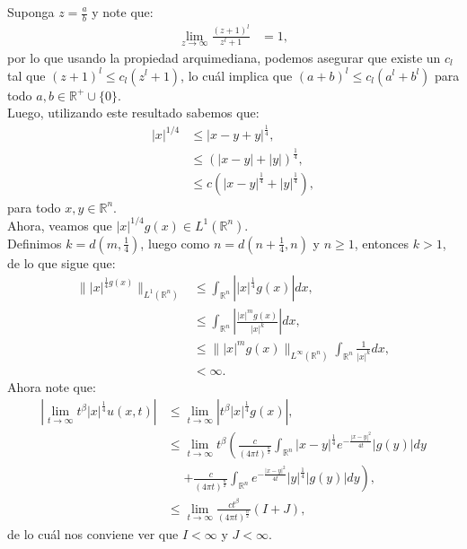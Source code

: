 \begin{homeworkProblem}
\begin{enumerate}
\begin{solucion}
      Suponga $z=\frac{a}{b}$ y note que:
      \begin{align*}
        \lim_{z \rightarrow \infty}\frac{(z+1)^l}{z^l+1}&=1,
      \end{align*}
      por lo que usando la propiedad arquimediana, podemos asegurar que existe un $c_l$ tal que $(z+1)^{l}\leq c_l(z^l+1)$, lo cuál implica que $(a+b)^{l}\leq c_l(a^l+b^l)$ para todo $a,b\in\mathbb{R}^{+}\cup\{0\}$.\\
      Luego, utilizando este resultado sabemos que:
      \begin{align*}
        |x|^{1/4}&\leq |x-y+y|^{\frac{1}{4}},\\
        &\leq (|x-y|+|y|)^{\frac{1}{4}},\\
        &\leq c(|x-y|^{\frac{1}{4}}+|y|^{\frac{1}{4}}),
      \end{align*}
      para todo $x,y\in\mathbb{R}^{n}$.\\
      Ahora, veamos que $|x|^{1/4}g(x)\in L^{1}(\mathbb{R}^{n})$.\\
      Definimos $k=d(m,\frac{1}{4})$, luego como $n=d(n+\frac{1}{4},n)$ y $n\geq 1$, entonces $k>1$, de lo que sigue que:
      \begin{align*}
        \||x|^{\frac{1}{4}g(x)}\|_{L^{1}(\mathbb{R}^{n})}&\leq \int_{\mathbb{R}^{n}}\left| |x|^{\frac{1}{4}}g(x) \right|dx,\\
        &\leq \int_{\mathbb{R}^{n}}\left| \frac{|x|^{m}g(x)}{|x|^{k}} \right|dx,\\
        &\leq \||x|^{m}g(x)\|_{L^{\infty}(\mathbb{R}^{n})}\int_{\mathbb{R}^{n}}\frac{1}{|x|^k}dx,\\
        &< \infty. 
      \end{align*}
      Ahora note que:
      \begin{align*}
        \left|\lim_{t \rightarrow \infty}t^{\beta}|x|^{\frac{1}{4}}u(x,t)\right|&\leq \lim_{t \rightarrow \infty}\left| t^{\beta}|x|^{\frac{1}{4}}g(x) \right|,\\
        &\leq \lim_{t \rightarrow \infty}t^{\beta}\left( \frac{c}{(4\pi t)^{\frac{n}{2}}}\int_{\mathbb{R}^{n}}|x-y|^{\frac{1}{4}}e^{-\frac{|x-y|^2}{4t}}|g(y)|dy\right.\\
        &\phantom{=}\left. + \frac{c}{(4\pi t)^{\frac{n}{2}}}\int_{\mathbb{R}^{n}}e^{-\frac{|x-y|^2}{4t}}|y|^{\frac{1}{4}}|g(y)|dy\right),\\
        &\leq \lim_{t \rightarrow \infty}\frac{ct^{\beta}}{(4\pi t)^{\frac{n}{2}}}(I+J),
      \end{align*}
      de lo cuál nos conviene ver que $I<\infty$ y $J<\infty$.\\

\end{solucion}
\end{enumerate}
\end{homeworkProblem}
